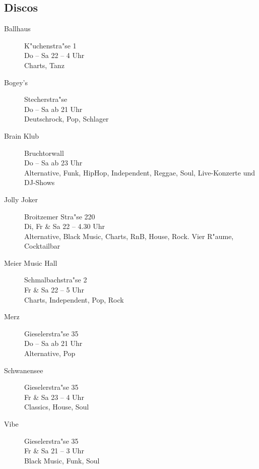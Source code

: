 \subsection{Discos}

\begin{description}
\item[Ballhaus] \hfill K"uchenstra"se 1\\
Do -- Sa \hfill 22 -- 4 Uhr\\
Charts, Tanz

\item[Bogey's] \hfill Stecherstra"se\\
Do -- Sa \hfill ab 21 Uhr\\
Deutschrock, Pop, Schlager

\item[Brain Klub] \hfill Bruchtorwall\\
Do -- Sa \hfill ab 23 Uhr\\
Alternative, Funk, HipHop, Independent, Reggae, Soul, Live-Konzerte und DJ-Shows\\

\item[Jolly Joker] \hfill Broitzemer Stra"se 220\\
Di, Fr \& Sa \hfill 22 -- 4.30 Uhr\\
Alternative, Black Music, Charts, RnB, House, Rock. Vier R"aume, Cocktailbar\\

\item[Meier Music Hall] \hfill Schmalbachstra"se 2\\
Fr \& Sa \hfill 22 -- 5 Uhr\\
Charts, Independent, Pop, Rock\\

\item[Merz] \hfill Gieselerstra"se 35\\
Do -- Sa \hfill ab 21 Uhr\\
Alternative, Pop\\

\item[Schwanensee] \hfill Gieselerstra"se 35\\
Fr \& Sa \hfill 23 -- 4 Uhr\\
Classics, House, Soul

\item[Vibe] \hfill Gieselerstra"se 35\\
Fr \& Sa \hfill 21 -- 3 Uhr\\
Black Music, Funk, Soul\\

\end{description}


